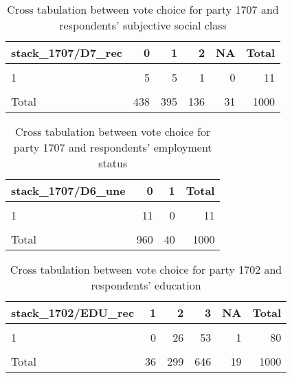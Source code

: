 \documentclass[
]{article}
\begin{document}
\begin{table}

\caption{\label{tab:unnamed-chunk-114}Cross tabulation between vote choice for party 1707 and respondents' subjective social class
                   \label{table:crosstab_3_lt}}
\centering
\begin{tabular}[t]{l|r|r|r|r|r}
\hline
stack\_1707/D7\_rec & 0 & 1 & 2 & NA & Total\\
\hline
\cellcolor{gray!6}{0} & \cellcolor{gray!6}{387} & \cellcolor{gray!6}{353} & \cellcolor{gray!6}{125} & \cellcolor{gray!6}{27} & \cellcolor{gray!6}{892}\\
\hline
1 & 5 & 5 & 1 & 0 & 11\\
\hline
\cellcolor{gray!6}{NA} & \cellcolor{gray!6}{46} & \cellcolor{gray!6}{37} & \cellcolor{gray!6}{10} & \cellcolor{gray!6}{4} & \cellcolor{gray!6}{97}\\
\hline
Total & 438 & 395 & 136 & 31 & 1000\\
\hline
\end{tabular}
\end{table}

\begin{table}

\caption{\label{tab:unnamed-chunk-114}Cross tabulation between vote choice for party 1707 and respondents' employment status
                   \label{table:crosstab_4_lt}}
\centering
\begin{tabular}[t]{l|r|r|r}
\hline
stack\_1707/D6\_une & 0 & 1 & Total\\
\hline
\cellcolor{gray!6}{0} & \cellcolor{gray!6}{858} & \cellcolor{gray!6}{34} & \cellcolor{gray!6}{892}\\
\hline
1 & 11 & 0 & 11\\
\hline
\cellcolor{gray!6}{NA} & \cellcolor{gray!6}{91} & \cellcolor{gray!6}{6} & \cellcolor{gray!6}{97}\\
\hline
Total & 960 & 40 & 1000\\
\hline
\end{tabular}
\end{table}

\begin{table}

\caption{\label{tab:unnamed-chunk-114}Cross tabulation between vote choice for party 1702 and respondents' education
                   \label{table:crosstab_5_lt}}
\centering
\begin{tabular}[t]{l|r|r|r|r|r}
\hline
stack\_1702/EDU\_rec & 1 & 2 & 3 & NA & Total\\
\hline
\cellcolor{gray!6}{0} & \cellcolor{gray!6}{29} & \cellcolor{gray!6}{245} & \cellcolor{gray!6}{534} & \cellcolor{gray!6}{15} & \cellcolor{gray!6}{823}\\
\hline
1 & 0 & 26 & 53 & 1 & 80\\
\hline
\cellcolor{gray!6}{NA} & \cellcolor{gray!6}{7} & \cellcolor{gray!6}{28} & \cellcolor{gray!6}{59} & \cellcolor{gray!6}{3} & \cellcolor{gray!6}{97}\\
\hline
Total & 36 & 299 & 646 & 19 & 1000\\
\hline
\end{tabular}
\end{table}
\end{document}
